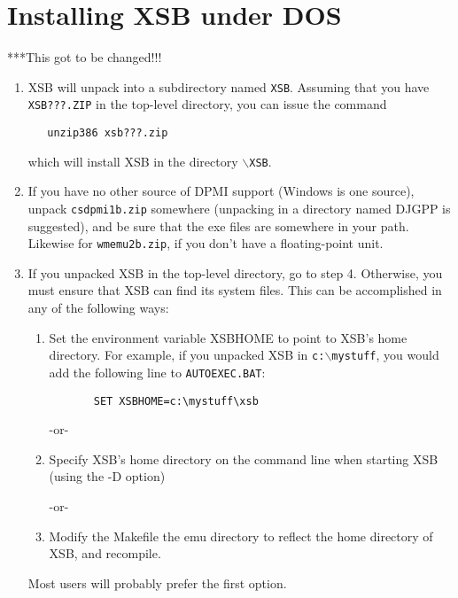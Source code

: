 \section{Installing XSB under DOS} \label{quick:DOS}

***This got to be changed!!!

\begin{enumerate}
\item 
   XSB will unpack into a subdirectory named {\tt XSB}.
   Assuming that you have {\tt XSB???.ZIP} in the top-level directory,
   you can issue the command
\begin{verbatim}
   unzip386 xsb???.zip
\end{verbatim}
   which will install XSB in the directory {\tt $\backslash$XSB}.

\item 
   If you have no other source of DPMI support (Windows is one source),
   unpack {\tt csdpmi1b.zip} somewhere (unpacking in a directory named
   DJGPP is suggested), and be sure that the exe files are somewhere
   in your path.  Likewise for {\tt wmemu2b.zip}, if you don't have a
   floating-point unit.

\item 
   If you unpacked XSB in the top-level directory, go to step 4.
   Otherwise, you must ensure that XSB can find its system files.
   This can be accomplished in any of the following ways:
\begin{enumerate}
\item   Set the environment variable XSBHOME to point to XSB's
       home directory.  For example, if you unpacked XSB in
       {\tt c:$\backslash$mystuff}, you would add the following line to
       {\tt AUTOEXEC.BAT}:
\begin{verbatim}
       SET XSBHOME=c:\mystuff\xsb
\end{verbatim}
\begin{center}
   -or-
\end{center}
\item  Specify XSB's home directory on the command line when
       starting XSB (using the -D option)
\begin{center}
   -or-
\end{center}
\item  Modify the Makefile the emu directory to reflect the
       home directory of XSB, and recompile.
\end{enumerate}
   Most users will probably prefer the first option.


\end{enumerate}
